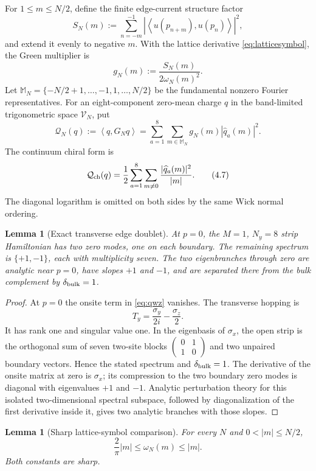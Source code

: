 \documentclass[11pt]{article}
\newtheorem{lemma}[theorem]{Lemma}
\theoremstyle{remark}
\newcommand{\V}{\mathcal V}
\newcommand{\ip}[2]{\left\langle#1,#2\right\rangle}
\begin{document}
For $1\le m\le N/2$, define the finite edge-current structure factor
\[
 S_N(m)
 :=\sum_{n=-m}^{-1}
 \left|\ip{u(p_{n+m})}{u(p_n)}\right|^2,
\tag{4.4}\label{eq:structurefactor}
\]
and extend it evenly to negative $m$.  With the lattice derivative
\eqref{eq:latticesymbol}, the Green multiplier is
\[
 g_N(m):=\frac{S_N(m)}{2\omega_N(m)^2}.
\tag{4.5}\label{eq:greenmultiplier}
\]
Let
$\mathbb M_N=\{-N/2+1,\ldots,-1,1,\ldots,N/2\}$ be the fundamental
nonzero Fourier representatives.  For an eight-component zero-mean
charge $q$ in the band-limited trigonometric space $\V_N$, put
\[
 \mathcal Q_N(q):=\ip{q}{G_Nq}
 =\sum_{a=1}^8\sum_{m\in\mathbb M_N}
 g_N(m)|\widehat q_a(m)|^2.
\tag{4.6}\label{eq:greenform}
\]
The continuum chiral form is
\[
 \mathcal Q_{\rm ch}(q)
 =\frac12\sum_{a=1}^8\sum_{m\ne0}
 \frac{|\widehat q_a(m)|^2}{|m|}.
\tag{4.7}\label{eq:chiralgreen}
\]
The diagonal logarithm is omitted on both sides by the same Wick
normal ordering.

\begin{lemma}[Exact transverse edge doublet]\label{lem:edgedoublet}
At $p=0$, the $M=1$, $N_y=8$ strip Hamiltonian has two zero modes, one
on each boundary.  The remaining spectrum is $\{+1,-1\}$, each with
multiplicity seven.  The two eigenbranches through zero are analytic
near $p=0$, have slopes $+1$ and $-1$, and are separated there from the
bulk complement by $\delta_{\rm bulk}=1$.
\end{lemma}

\begin{proof}
At $p=0$ the onsite term in \eqref{eq:qwz} vanishes.  The transverse
hopping is
\[
 T_y=\frac{\sigma_y}{2i}-\frac{\sigma_z}{2}.
\]
It has rank one and singular value one.  In the eigenbasis of
$\sigma_x$, the open strip is the orthogonal sum of seven two-site
blocks
$\left(\begin{smallmatrix}0&1\\1&0\end{smallmatrix}\right)$ and two
unpaired boundary vectors.  Hence the stated spectrum and
$\delta_{\rm bulk}=1$.  The derivative of the onsite matrix at zero is
$\sigma_x$; its compression to the two boundary zero modes is diagonal
with eigenvalues $+1$ and $-1$.  Analytic perturbation theory for this
isolated two-dimensional spectral subspace, followed by diagonalization
of the first derivative inside it, gives two analytic branches with
those slopes.
\end{proof}

\begin{lemma}[Sharp lattice-symbol comparison]\label{lem:sine}
For every $N$ and $0<|m|\le N/2$,
\[
 \frac{2}{\pi}|m|\le\omega_N(m)\le |m|.
\tag{4.8}\label{eq:sinecomparison}
\]
Both constants are sharp.
\end{lemma}
\end{document}
